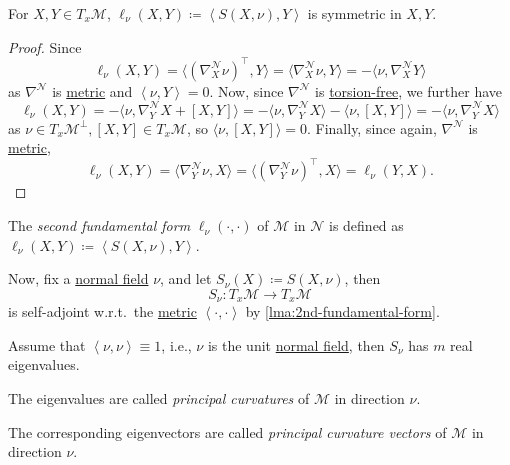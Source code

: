 \begin{lemma}\label{lma:2nd-fundamental-form}
	For \(X, Y\in T_x \mathcal{M} \), \(\ell _\nu (X, Y) \coloneqq \left\langle S(X, \nu) , Y\right\rangle \) is symmetric in \(X, Y\).
\end{lemma}
\begin{proof}
	Since
	\[
		\ell _\nu (X, Y)
		= \langle (\nabla ^\mathcal{N} _X \nu )^{\top}, Y \rangle
		= \langle \nabla _X^{\mathcal{N} } \nu , Y  \rangle
		= - \langle \nu , \nabla ^\mathcal{N} _X Y \rangle
	\]
	as \(\nabla ^\mathcal{N} \) is \hyperref[def:Riemannian]{metric} and \(\left\langle \nu , Y \right\rangle=0 \). Now, since \(\nabla ^\mathcal{N} \) is \hyperref[def:torsion-free]{torsion-free}, we further have
	\[
		\ell _\nu (X, Y)
		= - \langle \nu , \nabla ^\mathcal{N} _Y X + [X, Y] \rangle
		= - \langle \nu , \nabla ^\mathcal{N} _Y X \rangle - \langle \nu , [X, Y] \rangle
		= - \langle \nu , \nabla ^\mathcal{N} _Y X \rangle
	\]
	as \(\nu \in T_x \mathcal{M} ^{\perp}, [X, Y]\in T_x \mathcal{M}\), so \(\langle \nu , [X, Y] \rangle=0\). Finally, since again, \(\nabla ^\mathcal{N} \) is \hyperref[def:Riemannian]{metric},
	\[
		\ell _\nu (X, Y)
		= \langle \nabla _Y^{\mathcal{N} } \nu , X  \rangle
		= \langle (\nabla _Y^{\mathcal{N} } \nu)^{\top} , X  \rangle
		= \ell _\nu (Y, X).
	\]
\end{proof}

\begin{definition}\label{def:2nd-fundamental-form}
	The \emph{second fundamental form} \(\ell _\nu (\cdot, \cdot)\) of \(\mathcal{M} \) in \(\mathcal{N} \) is defined as \(\ell _\nu (X, Y) \coloneqq \left\langle S(X, \nu ), Y \right\rangle \).
\end{definition}

Now, fix a \hyperref[not:normal-bundle]{normal field} \(\nu \), and let \(S_\nu (X) \coloneqq S(X, \nu )\), then
\[
	S_\nu \colon T_x \mathcal{M} \to T_x \mathcal{M}
\]
is self-adjoint w.r.t.\ the \hyperref[def:Riemannian-metric]{metric} \(\left\langle \cdot, \cdot \right\rangle \) by \autoref{lma:2nd-fundamental-form}.

\begin{definition*}
	Assume that \(\left\langle \nu , \nu  \right\rangle \equiv 1\), i.e., \(\nu \) is the unit \hyperref[not:normal-bundle]{normal field}, then \(S_\nu \) has \(m\) real eigenvalues.

	\begin{definition}\label{def:principal-curvature}
		The eigenvalues are called \emph{principal curvatures} of \(\mathcal{M} \) in direction \(\nu \).
	\end{definition}

	\begin{definition}\label{def:principal-curvature-vector}
		The corresponding eigenvectors are called \emph{principal curvature vectors} of \(\mathcal{M} \) in direction \(\nu \).
	\end{definition}
\end{definition*}


